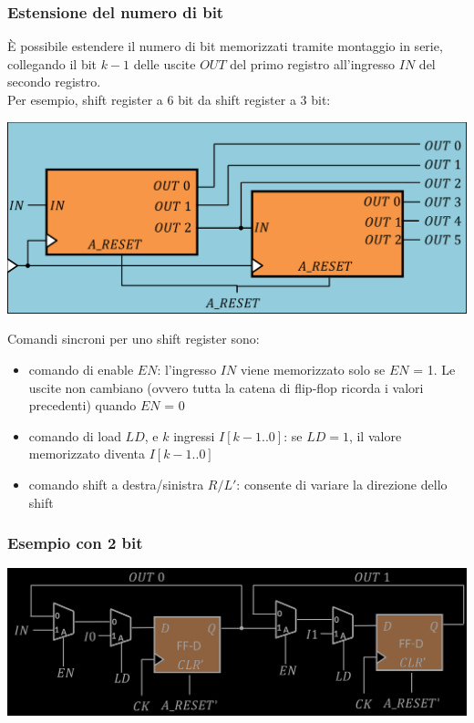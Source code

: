 \documentclass{article}
\begin{document}
\subsubsection*{Estensione del numero di bit}
È possibile estendere il numero di bit memorizzati tramite montaggio in serie, collegando il bit $k-1$ delle uscite $OUT$ del primo registro all’ingresso $IN$ del secondo registro.\\
Per esempio, shift register a 6 bit da shift register a 3 bit:
\begin{center}
    \includegraphics[scale=0.35]{shift register esteso.png}
\end{center}
Comandi sincroni per uno shift register sono:
\begin{itemize}
    \item comando di enable $EN$: l’ingresso $IN$ viene memorizzato solo se $EN$ = 1. Le uscite non cambiano (ovvero tutta la catena di flip-flop ricorda i valori precedenti) quando $EN$ = 0
    \item comando di load $LD$, e $k$ ingressi $I[k-1..0]$: se $LD=1$, il valore memorizzato diventa $I[k-1..0]$
    \item comando shift a destra/sinistra $R/L'$: consente di variare la direzione dello shift
\end{itemize}


\subsubsection*{Esempio con 2 bit}
\begin{center}
    \includegraphics[scale=0.35]{shift register 2 bit.png}
\end{center}
\end{document}
